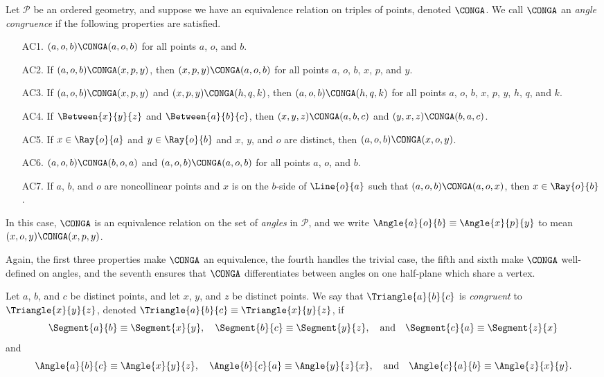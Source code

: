 \documentclass{article}
\begin{document}
\begin{dfn}
Let $\mathcal{P}$ be an ordered geometry, and suppose we have an equivalence relation on triples of points, denoted $\CONGA$. We call $\CONGA$ an \emph{angle congruence} if the following properties are satisfied.
\begin{itemize}
\item[AC1.] $(a,o,b) \CONGA (a,o,b)$ for all points $a$, $o$, and $b$.
\item[AC2.] If $(a,o,b) \CONGA (x,p,y)$, then $(x,p,y) \CONGA (a,o,b)$ for all points $a$, $o$, $b$, $x$, $p$, and $y$.
\item[AC3.] If $(a,o,b) \CONGA (x,p,y)$ and $(x,p,y) \CONGA (h,q,k)$, then $(a,o,b) \CONGA (h,q,k)$ for all points $a$, $o$, $b$, $x$, $p$, $y$, $h$, $q$, and $k$.
\item[AC4.] If $\Between{x}{y}{z}$ and $\Between{a}{b}{c}$, then $(x,y,z) \CONGA (a,b,c)$ and $(y,x,z) \CONGA (b,a,c)$.
\item[AC5.] If $x \in \Ray{o}{a}$ and $y \in \Ray{o}{b}$ and $x$, $y$, and $o$ are distinct, then $(a,o,b) \CONGA (x,o,y)$.
\item[AC6.] $(a,o,b) \CONGA (b,o,a)$ and $(a,o,b) \CONGA (a,o,b)$ for all points $a$, $o$, and $b$.
\item[AC7.] If $a$, $b$, and $o$ are noncollinear points and $x$ is on the $b$-side of $\Line{o}{a}$ such that $(a,o,b) \CONGA (a,o,x)$, then $x \in \Ray{o}{b}$.
\end{itemize}

In this case, $\CONGA$ is an equivalence relation on the set of \emph{angles} in $\mathcal{P}$, and we write $\Angle{a}{o}{b} \equiv \Angle{x}{p}{y}$ to mean $(x,o,y) \CONGA (x,p,y)$.
\end{dfn}

Again, the first three properties make $\CONGA$ an equivalence, the fourth handles the trivial case, the fifth and sixth make $\CONGA$ well-defined on angles, and the seventh ensures that $\CONGA$ differentiates between angles on one half-plane which share a vertex.

\begin{dfn}
Let $a$, $b$, and $c$ be distinct points, and let $x$, $y$, and $z$ be distinct points. We say that $\Triangle{a}{b}{c}$ is \emph{congruent} to $\Triangle{x}{y}{z}$, denoted $\Triangle{a}{b}{c} \equiv \Triangle{x}{y}{z}$, if \[ \Segment{a}{b} \equiv \Segment{x}{y}, \quad \Segment{b}{c} \equiv \Segment{y}{z}, \quad \mathrm{and} \quad \Segment{c}{a} \equiv \Segment{z}{x} \] and \[ \Angle{a}{b}{c} \equiv \Angle{x}{y}{z}, \quad \Angle{b}{c}{a} \equiv \Angle{y}{z}{x}, \quad \mathrm{and} \quad \Angle{c}{a}{b} \equiv \Angle{z}{x}{y}. \]
\end{dfn}
\end{document}
